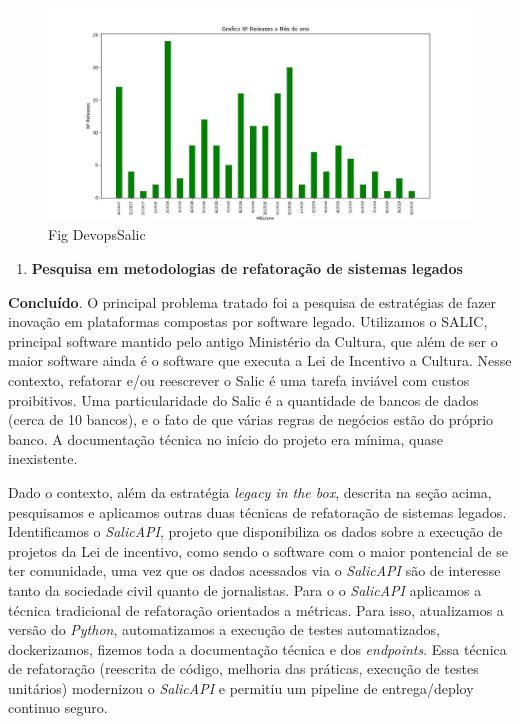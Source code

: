 \begin{figure}
\centering
\includegraphics{figs/salic-devops.jpg}
\caption{Fig DevopsSalic}
\end{figure}

\begin{enumerate}
\def\labelenumi{\arabic{enumi}.}
\setcounter{enumi}{1}
\tightlist
\item
  \textbf{Pesquisa em metodologias de refatoração de sistemas legados}
\end{enumerate}

\textbf{Concluído}. O principal problema tratado foi a pesquisa de
estratégias de fazer inovação em plataformas compostas por software
legado. Utilizamos o SALIC, principal software mantido pelo antigo
Ministério da Cultura, que além de ser o maior software ainda é o
software que executa a Lei de Incentivo a Cultura. Nesse contexto,
refatorar e/ou reescrever o Salic é uma tarefa inviável com custos
proibitivos. Uma particularidade do Salic é a quantidade de bancos de
dados (cerca de 10 bancos), e o fato de que várias regras de negócios
estão do próprio banco. A documentação técnica no início do projeto era
mínima, quase inexistente.

Dado o contexto, além da estratégia \emph{legacy in the box}, descrita
na seção acima, pesquisamos e aplicamos outras duas técnicas de
refatoração de sistemas legados. Identificamos o \emph{SalicAPI},
projeto que disponibiliza os dados sobre a execução de projetos da Lei
de incentivo, como sendo o software com o maior pontencial de se ter
comunidade, uma vez que os dados acessados via o \emph{SalicAPI} são de
interesse tanto da sociedade civil quanto de jornalistas. Para o o
\emph{SalicAPI} aplicamos a técnica tradicional de refatoração
orientados a métricas. Para isso, atualizamos a versão do \emph{Python},
automatizamos a execução de testes automatizados, dockerizamos, fizemos
toda a documentação técnica e dos \emph{endpoints}. Essa técnica de
refatoração (reescrita de código, melhoria das práticas, execução de
testes unitários) modernizou o \emph{SalicAPI} e permitiu um pipeline de
entrega/deploy continuo seguro.

